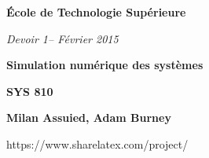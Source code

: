\documentclass[a4paper,12pt,fleqn]{article}
\newcommand{\institution}{École de Technologie Supérieure}
\newcommand{\titlehd}{Simulation numérique des systèmes}
\newcommand{\examtype}{Devoir 1}
\newcommand{\examdate}{Février 2015}
\newcommand{\examcode}{SYS 810}
\newcommand{\authors}{Milan Assuied, Adam Burney}
\begin{document}

\begin{center}
\large\textbf{\institution}
\end{center}
\vspace{1cm}

\begin{center}
\textit{ \examtype -- \examdate}
\end{center}
\vspace{1cm}

\begin{center}
\large\textbf{\titlehd}
\end{center}

\begin{center}
\large\textbf{\examcode}
\end{center}
\begin{center}
\large\textbf{\authors}
\end{center}https://www.sharelatex.com/project/
\vspace{4cm}




\newpage
\end{document}

